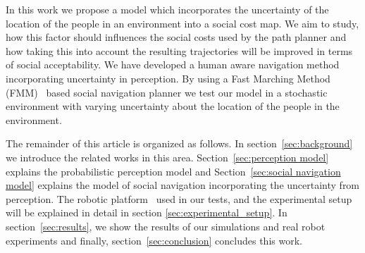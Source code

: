 In this work we propose a model which incorporates the uncertainty of the location of the people in an environment into a social cost map. We aim to study, how this factor should influences the social costs used by the path planner and how taking this into account the resulting trajectories will be improved in terms of social acceptability. We have developed a human aware navigation method incorporating uncertainty in perception. By using a Fast Marching Method (FMM)~\cite{sethian1999fast} based social navigation planner we test our model in a stochastic environment with varying uncertainty about the location of the people in the environment.

The remainder of this article is organized as follows. In section~\ref{sec:background} we introduce the related works in this area. Section~\ref{sec:perception model} explains the probabilistic perception model and Section~\ref{sec:social navigation model} explains the model of social navigation incorporating the uncertainty from perception. The robotic platform~\cite{Messias2014robotic} used in our tests, and the experimental setup will be explained in detail in section \ref{sec:experimental_setup}. In section~\ref{sec:results}, we show the results of our simulations and real robot experiments and finally, section~\ref{sec:conclusion} concludes this work.







